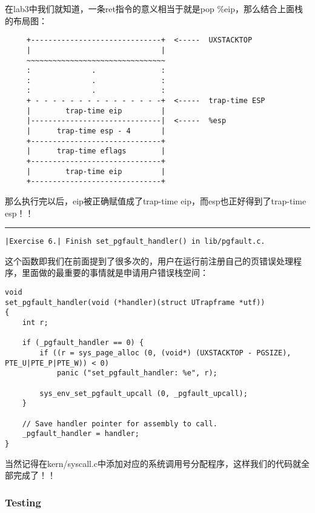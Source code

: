\documentclass{article}
\begin{document}
\begin{CJK*}{UTF8}{gkai}
\begin{enumerate}
{在lab3中我们就知道，一条ret指令的意义相当于就是pop \%eip，那么结合上面栈的布局图：

{\scriptsize \bfseries
\begin{verbatim}
     +------------------------------+  <-----  UXSTACKTOP
     |                              | 
     ~~~~~~~~~~~~~~~~~~~~~~~~~~~~~~~~
     :              .               :
     :              .               :
     :              .               :
     + - - - - - - - - - - - - - - -+  <-----  trap-time ESP
     |        trap-time eip         |
     |------------------------------|  <-----  %esp  
     |      trap-time esp - 4       | 
     +------------------------------+ 
     |      trap-time eflags        |
     +------------------------------+ 
     |        trap-time eip         |
     +------------------------------+ 
\end{verbatim}
}

那么执行完以后，eip被正确赋值成了trap-time eip，而esp也正好得到了trap-time esp！！

}
\end{enumerate}

\vspace{2em}
\hrule
\vspace{2em}

\begin{lstlisting}[style=exercise]
|Exercise 6.| Finish set_pgfault_handler() in lib/pgfault.c.
\end{lstlisting}

这个函数即我们在前面提到了很多次的，用户在运行前注册自己的页错误处理程序，里面做的最重要的事情就是申请用户错误栈空间：

\begin{lstlisting}[style=ccode, title={\scriptsize \ttfamily \bfseries lib/pgfault.c}]
void
set_pgfault_handler(void (*handler)(struct UTrapframe *utf))
{
    int r;

    if (_pgfault_handler == 0) {
        if ((r = sys_page_alloc (0, (void*) (UXSTACKTOP - PGSIZE), PTE_U|PTE_P|PTE_W)) < 0)
            panic ("set_pgfault_handler: %e", r);

        sys_env_set_pgfault_upcall (0, _pgfault_upcall);
    }

    // Save handler pointer for assembly to call.
    _pgfault_handler = handler;
}
\end{lstlisting}

当然记得在kern/syscall.c中添加对应的系统调用号分配程序，这样我们的代码就全部完成了！！


\subsubsection{Testing}


\end{CJK*}
\end{document}
